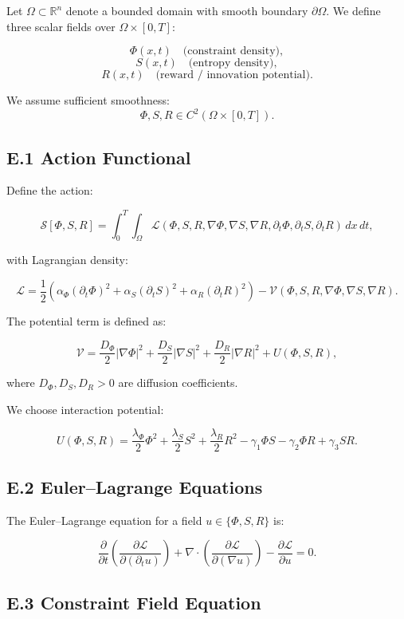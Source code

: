 \documentclass[12pt,a4paper]{article}
\theoremstyle{definition}
\begin{document}
Let $\Omega \subset \mathbb{R}^n$ denote a bounded domain with smooth boundary $\partial \Omega$. 
We define three scalar fields over $\Omega \times [0,T]$:

\[
\Phi(x,t) \quad \text{(constraint density)},
\]
\[
S(x,t) \quad \text{(entropy density)},
\]
\[
R(x,t) \quad \text{(reward / innovation potential)}.
\]

We assume sufficient smoothness:
\[
\Phi, S, R \in C^2(\Omega \times [0,T]).
\]

\subsection*{E.1 Action Functional}

Define the action:

\[
\mathcal{S}[\Phi,S,R]
=
\int_0^T \int_\Omega 
\mathcal{L}(\Phi,S,R,\nabla \Phi,\nabla S,\nabla R,\partial_t \Phi,\partial_t S,\partial_t R)
\, dx \, dt,
\]

with Lagrangian density:

\[
\mathcal{L}
=
\frac{1}{2} \left( \alpha_\Phi (\partial_t \Phi)^2
+ \alpha_S (\partial_t S)^2
+ \alpha_R (\partial_t R)^2 \right)
-
\mathcal{V}(\Phi,S,R,\nabla \Phi,\nabla S,\nabla R).
\]

The potential term is defined as:

\[
\mathcal{V}
=
\frac{D_\Phi}{2} |\nabla \Phi|^2
+
\frac{D_S}{2} |\nabla S|^2
+
\frac{D_R}{2} |\nabla R|^2
+
U(\Phi,S,R),
\]

where $D_\Phi, D_S, D_R > 0$ are diffusion coefficients.

We choose interaction potential:

\[
U(\Phi,S,R)
=
\frac{\lambda_\Phi}{2} \Phi^2
+
\frac{\lambda_S}{2} S^2
+
\frac{\lambda_R}{2} R^2
-
\gamma_1 \Phi S
-
\gamma_2 \Phi R
+
\gamma_3 S R.
\]

\subsection*{E.2 Euler--Lagrange Equations}

The Euler–Lagrange equation for a field $u \in \{\Phi,S,R\}$ is:

\[
\frac{\partial}{\partial t}
\left(
\frac{\partial \mathcal{L}}{\partial (\partial_t u)}
\right)
+
\nabla \cdot
\left(
\frac{\partial \mathcal{L}}{\partial (\nabla u)}
\right)
-
\frac{\partial \mathcal{L}}{\partial u}
=
0.
\]

\subsection*{E.3 Constraint Field Equation}
\end{document}
